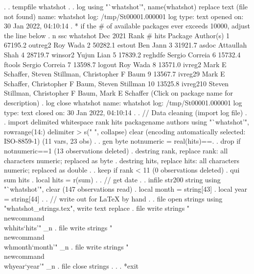 . 
. tempfile whatshot
{\smallskip}
. 
. log using "`whatshot'", name(whatshot) replace text
(file{} not found)
      name:  whatshot
       log:  /tmp/St00001.000001
  log type:  text
 opened on:  30 Jan 2022, 04:10:14
{\smallskip}
. * if the \# of available packages ever exceeds 10000, adjust the line below
. n ssc whatshot
{\smallskip}
{}
{\smallskip}
        Dec 2021   
  Rank   \# hits    Package       Author(s)
     1  67195.2    outreg2       Roy Wada                                
     2  50282.1    estout        Ben Jann                                
     3  31921.7    asdoc         Attaullah Shah                          
     4  28719.7    winsor2       Yujun Lian                              
     5  17839.2    reghdfe       Sergio Correia                          
     6  15732.4    ftools        Sergio Correia                          
     7  13598.7    logout        Roy Wada                                
     8  13571.0    ivreg2        Mark E Schaffer, Steven Stillman,       
                                   Christopher F Baum                      
     9  13567.7    ivreg29       Mark E Schaffer, Christopher F Baum,    
                                   Steven Stillman                         
    10  13525.8    ivreg210      Steven Stillman, Christopher F Baum,    
                                   Mark E Schaffer                         
  (Click on package name for description)
{\smallskip}
. log close whatshot
      name:  whatshot
       log:  /tmp/St00001.000001
  log type:  text
 closed on:  30 Jan 2022, 04:10:14
{\smallskip}
. 
. // Data cleaning (import log file)
. 
. import delimited whitespace rank hits packagename authors using "`whatshot'", rowrange(14:) delimiter
> s("       ", collapse) clear
(encoding automatically selected: ISO-8859-1)
(11 vars, 23 obs)
{\smallskip}
. 
. gen byte notnumeric = real(hits)==.
{\smallskip}
. drop if notnumeric==1
(13 observations deleted)
{\smallskip}
. destring rank, replace
rank: all characters numeric; replaced as byte
{\smallskip}
. destring hits, replace
hits: all characters numeric; replaced as double
{\smallskip}
. 
. keep if rank < 11
(0 observations deleted)
{\smallskip}
. qui sum hits
{\smallskip}
. local hits = r(sum)
{\smallskip}
. 
. // get date
. 
. infile str200 string  using "`whatshot'",  clear
(147 observations read)
{\smallskip}
. local month = string[43]
{\smallskip}
. local year  = string[44]
{\smallskip}
. 
. // write out for LaTeX by hand
. 
. file open strings using "whatshot_strings.tex", write text replace
{\smallskip}
. file write strings  "\\newcommand{\lbr}\\whhits{\rbr}{\lbr}`hits'{\rbr}" _n
{\smallskip}
. file write strings  "\\newcommand{\lbr}\\whmonth{\rbr}{\lbr}`month'{\rbr}" _n
{\smallskip}
. file write strings  "\\newcommand{\lbr}\\whyear{\rbr}{\lbr}`year'{\rbr}" _n
{\smallskip}
. file close strings
{\smallskip}
. 
. 
. *exit
